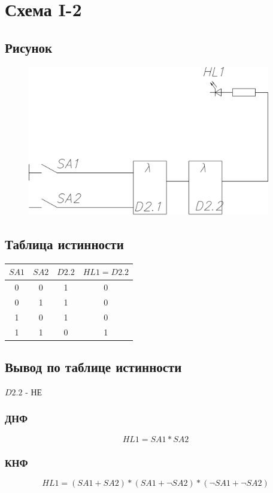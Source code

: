 \documentclass[a4paper]{article}
\begin{document}
\pagebreak

\section{Схема I-2}
\subsection{Рисунок}
\begin{figure}[H]
    \centering
    \includegraphics[width=300pt]{2.png}
\end{figure}
\subsection{Таблица истинности}
\begin{table}[H]
    \centering
    \begin{tabular}{|c|c|c|c|}
        \hline
        $SA1$ & $SA2$ & $D2.2$ & $HL1 = D2.2$\\
        \hline
        0 & 0 & 1 & 0 \\
        0 & 1 & 1 & 0 \\
        1 & 0 & 1 & 0 \\
        1 & 1 & 0 & 1 \\
        \hline
    \end{tabular}
\end{table}

\subsection{Вывод по таблице истинности}
$D2.2$ - НЕ
\subsubsection{ДНФ}
$$ HL1 = SA1 * SA2 $$
\subsubsection{КНФ}
$$ HL1 = (SA1 + SA2) * (SA1 + \neg SA2) * (\neg SA1 + \neg SA2) $$
\end{document}
